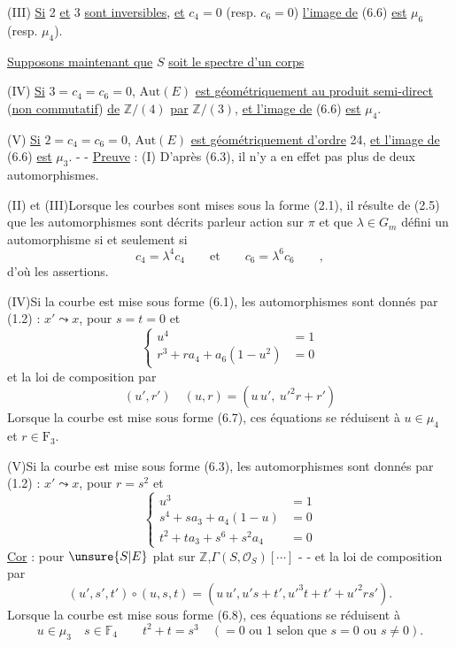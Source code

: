 (III) \uline{Si} 2 \uline{et} 3 \uline{sont inversibles}, \uline{et} $c_4=0$ (resp. $c_6=0$) \uline{l'image de} (6.6) \uline{est} $\mu_6$ (resp. $\mu_4$).

\uline{Supposons maintenant que} $S$ \uline{soit le spectre d'un corps}

(IV) \uline{Si} $3=c_4=c_6=0$, $\mathrm{Aut}(E)$ \uline{est géométriquement  au produit semi-direct} (\uline{non commutatif}) \uline{de} $\mathbb Z/(4)$ \uline{par} $\mathbb Z/(3)$, \uline{et l'image de} (6.6) \uline{est} $\mu_4$.

(V) \uline{Si} $2=c_4=c_6=0$, $\mathrm{Aut}(E)$ \uline{est géométriquement d'ordre} 24, \uline{et l'image de} (6.6) \uline{est} $\mu_3$.
\margin{\unsure{$\rho$}}
-  -
\uline{Preuve} : (I) D'après (6.3), il n'y a en effet pas plus de deux automorphismes.

(II) et (III)\quad Lorsque les courbes sont mises sous la forme (2.1), il résulte de (2.5) que les automorphismes sont décrits parleur action sur $\pi$ et que $\lambda\in G_m$ défini un automorphisme si et seulement si
\[
c_4=\lambda^4c_4\qquad\text{et}\qquad c_6=\lambda^6c_6\qquad,
\]
d'où les assertions.

(IV)\quad Si la courbe est mise sous forme (6.1), les automorphismes sont donnés par (1.2) : $x'\leadsto x$, pour $s=t=0$ et
\[
\left\{\begin{aligned}
u^4&=1\\
r^3+ra_4+a_6(1-u^2)&=0
\end{aligned}\right.
\]
et la loi de composition par
\[
(u',r')\quad(u,r)=(u\,u',\ u'^2r+r')
\]
Lorsque la courbe est mise sous forme (6.7), ces équations se réduisent à $u\in\mu_4$ et $r\in\mathrm F_3$.

(V)\quad Si la courbe est mise sous forme (6.3), les automorphismes sont donnés par (1.2) : $x'\leadsto x$, pour $r=s^2$ et
\[
\left\{\begin{aligned}
u^3&=1\\
s^4+sa_3+a_4(1-u)&=0\\
t^2+ta_3+s^6+s^2a_4&=0
\end{aligned}\right.
\]
\uline{Cor} : pour $\unsure{S|E}$ plat sur $\mathbb Z$,\qquad $\Gamma(S,\mathcal O_S)[\cdots]$
-  -
et la loi de composition par
\[
(u',s',t')\circ(u,s,t)=(u\,u',u's+t',u'^3t+t'+u'^2rs').
\]
Lorsque la courbe est mise sous forme (6.8), ces équations se réduisent à
\[
u\in\mu_3\quad s\in\mathbb F_4\qquad t^2+t=s^3\quad(=0\text{ ou }1\text{ selon que }s=0\text{ ou }s\ne0).
\]


